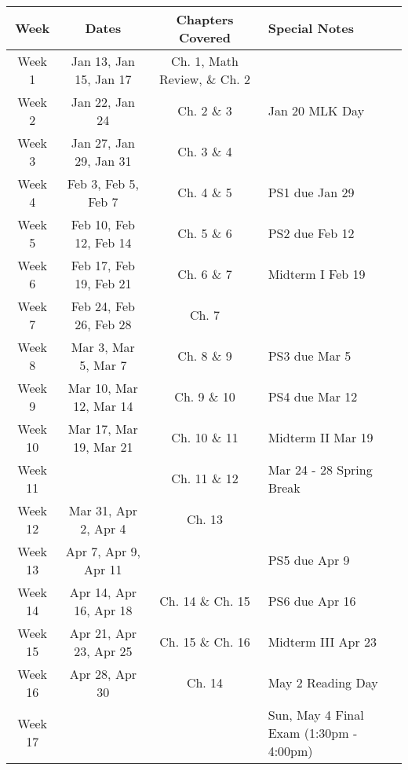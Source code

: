 \documentclass[11pt]{article}
\begin{document}
\newpage
{}\\

\begin{tabularx}{\textwidth}{|c|c|c|X|}
    \hline
    \textbf{Week} & \textbf{Dates} & \textbf{Chapters Covered} & \textbf{Special Notes} \\
    \hline
    Week 1 & Jan 13, Jan 15, Jan 17 & Ch. 1, Math Review, \& Ch. 2 & \\
    \hline
    Week 2 & Jan 22, Jan 24 & Ch. 2 \& 3 & Jan 20 MLK Day\\
    \hline
    Week 3 & Jan 27, Jan 29, Jan 31 & Ch. 3 \& 4 & \\
    \hline
    Week 4 & Feb 3, Feb 5, Feb 7 & Ch. 4 \& 5 & PS1 due Jan 29 \\
    \hline
	Week 5 & Feb 10, Feb 12, Feb 14 & Ch. 5 \& 6 & PS2 due Feb 12\\
    \hline
    Week 6 & Feb 17, Feb 19, Feb 21 & Ch. 6 \& 7 & Midterm I Feb 19 \\
    \hline
    Week 7 & Feb 24, Feb 26, Feb 28 & Ch. 7 & \\
    \hline
    Week 8 & Mar 3, Mar 5, Mar 7 & Ch. 8 \& 9 & PS3 due Mar 5 \\
    \hline
	Week 9 & Mar 10, Mar 12, Mar 14 & Ch. 9 \& 10 & PS4 due Mar 12 \\
    \hline
	Week 10 & Mar 17, Mar 19, Mar 21 & Ch. 10 \& 11 & Midterm II Mar 19\\
    \hline
	Week 11 & & Ch. 11 \& 12 & Mar 24 - 28 Spring Break\\
    \hline
	Week 12 & Mar 31, Apr 2, Apr 4 & Ch. 13 & \\
    \hline
	Week 13 & Apr 7, Apr 9, Apr 11 & & PS5 due Apr 9 \\
    \hline
	Week 14 & Apr 14, Apr 16, Apr 18 & Ch. 14 \& Ch. 15 & PS6 due Apr 16 \\
    \hline
	Week 15 & Apr 21, Apr 23, Apr 25 & Ch. 15 \& Ch. 16 & Midterm III Apr 23\\
    \hline
	Week 16 & Apr 28, Apr 30 & Ch. 14 & May 2 Reading Day\\
    \hline
	Week 17 & & & Sun, May 4 Final Exam (1:30pm - 4:00pm)\\
    \hline
\end{tabularx}

\newpage

\medskip{}\\
\end{document}
